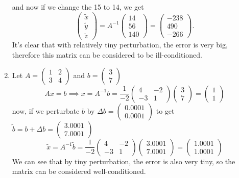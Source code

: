 \documentclass{article}
\newcommand*{\mat}[1]{\begin{pmatrix}#1\end{pmatrix}}
\begin{document}
\begin{enumerate}
{            and now if we change the 15 to 14, we get
            \begin{displaymath}
                \mat{\tilde{x}\\\tilde{y}\\\tilde{z}} 
                = A^{-1}\mat{14 \\ 56 \\ 140} 
                = \mat{-238 \\ 490 \\ -266}.
            \end{displaymath}
            It's clear that with relatively tiny perturbation, the error is very big, therefore this matrix can be considered to be ill-conditioned.
        }
        \item {
            Let \(A=\mat{1 & 2 \\ 3 & 4}\) and \(b = \mat{3 \\ 7}\)
            \begin{displaymath}
                Ax = b \implies x = A^{-1}b = \frac{1}{-2}\mat{4 & -2 \\ -3 & 1}\mat{3 \\ 7} = \mat{1 \\ 1}
            \end{displaymath}
            now, if we perturbate \(b\) by \(\Delta b = \mat{0.0001 \\ 0.0001}\) to get \(\tilde{b} = b + \Delta b = \mat{3.0001 \\ 7.0001}\)
            \begin{displaymath}
                \tilde{x} = A^{-1}\tilde{b} = \frac{1}{-2}\mat{4 & -2 \\ -3 & 1}\mat{3.0001 \\ 7.0001} = \mat{1.0001 \\ 1.0001}
            \end{displaymath}
            We can see that by tiny perturbation, the error is also very tiny, so the matrix can be considered well-conditioned.
        }
    \end{enumerate}
\end{document}
